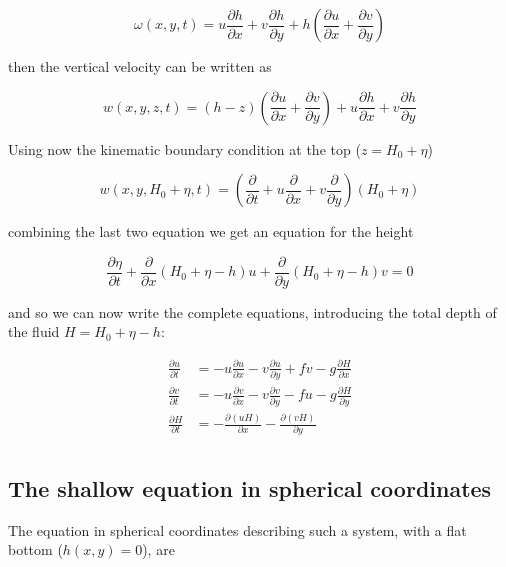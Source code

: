 \[\omega(x,y,t) = u\frac{\partial h}{\partial x} + v\frac{\partial h}{\partial y} + h \left(\frac{\partial u}{\partial x} + \frac{\partial v}{\partial y}\right)\]

then the vertical velocity can be written as

\[w(x,y,z,t) = (h-z)\left(\frac{\partial u}{\partial x} + \frac{\partial v}{\partial y}\right) + u\frac{\partial h}{\partial x} + v\frac{\partial h}{\partial y}\]

Using now the kinematic boundary condition at the top (\(z=H_0+\eta\))

\[w(x,y,H_0+\eta,t) = \left(\frac{\partial }{\partial t} + u\frac{\partial }{\partial x} + v\frac{\partial }{\partial y}\right)(H_0+\eta)\]

combining the last two equation we get an equation for the height

\[\frac{\partial \eta}{\partial t} + \frac{\partial }{\partial x}(H_0+\eta -h)u + \frac{\partial }{\partial y}(H_0+\eta -h)v = 0\]

and so we can now write the complete equations, introducing the total
depth of the fluid \(H=H_0+\eta -h\):

\[\begin{aligned}
\frac{\partial u}{\partial t} &= -u \frac{\partial u}{\partial x} -v \frac{\partial u}{\partial y} + f v -g\frac{\partial H}{\partial x} \\
\frac{\partial v}{\partial t} &= -u \frac{\partial v}{\partial x} -v \frac{\partial v}{\partial y} - f u -g\frac{\partial H}{\partial y}  \\
\frac{\partial H}{\partial t} &= - \frac{\partial (u H)}{\partial x} - \frac{\partial (v H)}{\partial y} \\
\end{aligned}\]

\subsection{The shallow equation in spherical
coordinates}\label{the-shallow-equation-in-spherical-coordinates}

The equation in spherical coordinates describing such a system, with a
flat bottom (\(h(x,y) =0\)), are

